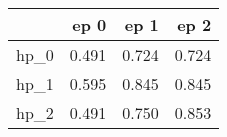 \begin{tabular}{lrrr}
\toprule
{} &   ep 0 &   ep 1 &   ep 2 \\
\midrule
hp\_0 &  0.491 &  0.724 &  0.724 \\
hp\_1 &  0.595 &  0.845 &  0.845 \\
hp\_2 &  0.491 &  0.750 &  0.853 \\
\bottomrule
\end{tabular}
